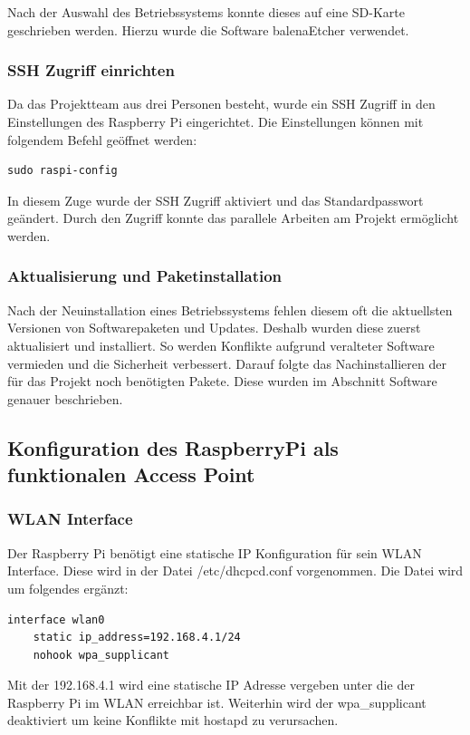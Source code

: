 \documentclass[a4paper,11pt,singlespacing]{article}
\begin{document}
        	Nach der Auswahl des Betriebssystems konnte dieses auf eine SD-Karte geschrieben werden.
        	Hierzu wurde die Software balenaEtcher verwendet.   
    	
    	\subsubsection{SSH Zugriff einrichten}
        	Da das Projektteam aus drei Personen besteht, wurde ein SSH Zugriff in den Einstellungen des Raspberry Pi eingerichtet. Die Einstellungen können mit folgendem Befehl geöffnet werden: 
        \begin{lstlisting}
sudo raspi-config
        \end{lstlisting} 
    	
        In diesem Zuge wurde der SSH Zugriff aktiviert und das Standardpasswort geändert. Durch den  Zugriff konnte das parallele Arbeiten am Projekt ermöglicht werden. 
    	
    	\subsubsection{Aktualisierung und Paketinstallation}
        	Nach der Neuinstallation eines Betriebssystems fehlen diesem oft die aktuellsten Versionen von Softwarepaketen und Updates. Deshalb wurden diese zuerst aktualisiert und installiert. So werden Konflikte aufgrund veralteter Software vermieden und die Sicherheit verbessert.  
        	Darauf folgte das Nachinstallieren der für das Projekt noch benötigten Pakete. Diese wurden im Abschnitt Software genauer beschrieben. 
    	
    	
    
    	\subsection{Konfiguration des RaspberryPi als funktionalen Access Point}
            \subsubsection{WLAN Interface}
                Der Raspberry Pi benötigt eine statische IP Konfiguration für sein WLAN Interface. Diese wird in der Datei /etc/dhcpcd.conf vorgenommen. Die Datei wird um folgendes ergänzt:\\
                \lstset{
                language=bash,
                }
                \begin{lstlisting}
interface wlan0
    static ip_address=192.168.4.1/24
    nohook wpa_supplicant
                \end{lstlisting} 
                Mit der 192.168.4.1 wird eine statische IP Adresse vergeben unter die der Raspberry Pi im WLAN erreichbar ist. Weiterhin wird der wpa{\_}supplicant deaktiviert um keine Konflikte mit hostapd zu verursachen. 
            
\end{document}

